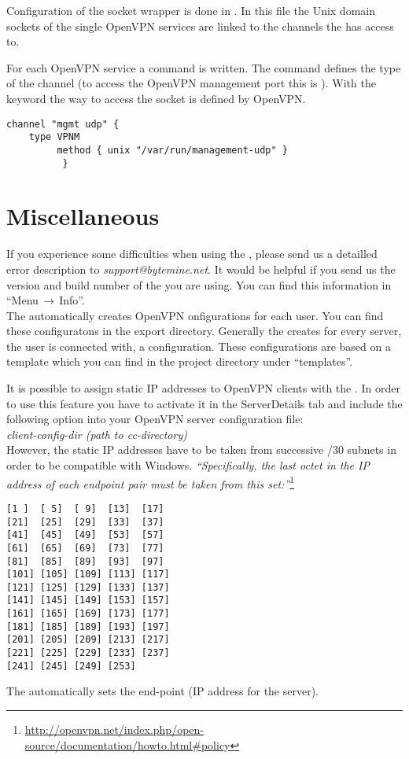 
\nl Configuration of the socket wrapper is done in .
In this file the Unix domain sockets of the single OpenVPN services are linked
to the channels the \Nbm{} has access to.

For each OpenVPN service a  command is written. The
 command defines the type of the channel (to access the OpenVPN
management port this is ). With the  keyword the way
to access the socket is defined by OpenVPN.

\begin{verbatim}
channel "mgmt udp" {
    type VPNM
	     method { unix "/var/run/management-udp" }
		  }
		  \end{verbatim}

\newpage

\section{Miscellaneous}

If you experience some difficulties when using the \Nbms, please send us a
detailled error description to \textsl{support@bytemine.net}.
It would be helpful if you send us the version and build number of the \Nbms
you are using. You can find this information in ``Menu$\,\rightarrow\,$Info''.\\

\label{OpenVPN configuration setting}
The \Nbm{} automatically creates OpenVPN onfigurations for each user. You can find
these configuratons in the export directory.
Generally the \Nbm{} creates for every server, the user is connected with, a
configuration. These configurations are based on a template which you can
find in the project directory under ``templates''.
\newpage

It is possible to assign static IP addresses to OpenVPN clients with the
\Nbm{}. In order to use this feature you have to activate it in the
ServerDetails tab and include the following option into your
OpenVPN server configuration file:\\[2mm]
\textit{client-config-dir (path to cc-directory)}\\[2mm]
However, the static IP addresses have to be taken from successive /30 subnets in
order to be compatible with Windows. \textit{``Specifically, the last octet in the IP
address of each endpoint pair must be taken from this
set:''}\footnote{\url{http://openvpn.net/index.php/open-source/documentation/howto.html\#policy}}
\begin{verbatim}
[1 ]  [ 5]  [ 9]  [13]  [17]
[21]  [25]  [29]  [33]  [37]
[41]  [45]  [49]  [53]  [57]
[61]  [65]  [69]  [73]  [77]
[81]  [85]  [89]  [93]  [97]
[101] [105] [109] [113] [117]
[121] [125] [129] [133] [137]
[141] [145] [149] [153] [157]
[161] [165] [169] [173] [177]
[181] [185] [189] [193] [197]
[201] [205] [209] [213] [217]
[221] [225] [229] [233] [237]
[241] [245] [249] [253]
\end{verbatim}
The \Nbm{} automatically sets the end-point (IP address for the server).

